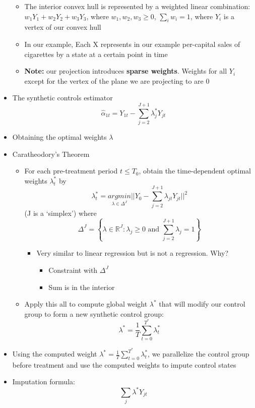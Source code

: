 \documentclass[10pt, oneside]{article}
\newcommand{\R}{\mathbb{R}}
\begin{document}
\begin{itemize}
\begin{itemize}
        \item The interior convex hull is represented by a weighted linear combination: $w_1 Y_1 + w_2 Y_2 + w_3 Y_3$, where $w_1, w_2, w_3 \geq 0$, $\sum_i {w_i} = 1$, where $Y_i$ is a vertex of our convex hull
        \item In our example, Each X represents in our example per-capital sales of cigarettes by a state at a certain point in time
        \item \textbf{Note:} our projection introduces \textbf{sparse weights}. Weights for all $Y_i$ except for the vertex of the plane we are projecting to are 0
    \end{itemize}
    \item The synthetic controls estimator
    \[\hat \alpha_{1t} = Y_{1t} - \sum_{j=2}^{J+1} \lambda_j^* Y_{jt} \]
    \item Obtaining the optimal weights $\lambda$
    \item Caratheodory's Theorem
    \begin{itemize}
        \item For each pre-treatment period $t\leq T_0$, obtain the time-dependent optimal weights $\lambda_t ^*$ by \[\lambda_t^* = \underset{\lambda \in \Delta^{J}}{argmin} ||Y_0 - \sum_{j=2}^{J+1} \lambda_{jt}Y_{jt}||^2\] (J is a `simplex') where \[\Delta^J = \left\{\lambda \in \R^J : \lambda_j \geq 0 \text{ and } \sum_{j=2}^{J+1} \lambda_j = 1\right\}\]
        \begin{itemize}
            \item Very similar to linear regression but is not a regression. Why?
            \begin{itemize}
                \item Constraint with $\Delta^J$
                \item Sum is in the interior
            \end{itemize}
        \end{itemize}
        \item Apply this all to compute global weight $\lambda^*$ that will modify our control group to form a new synthetic control group: \[\lambda^* = \frac{1}{T} \sum_{t=0}^{T^*} \lambda_t^*\]
    \end{itemize}
    \item Using the computed weight $\lambda^* = \frac{1}{T} \sum_{t=0}^{T^*} \lambda_t^*$, we parallelize the control group before treatment and use the computed weights to impute control states
    \item Imputation formula:\[\sum_j \lambda^* Y_{jt}\]
\end{itemize}


\end{document}
